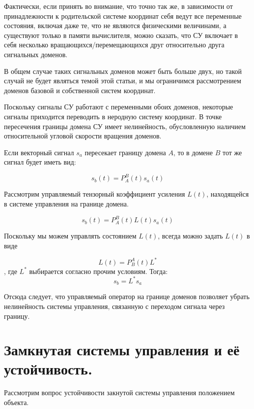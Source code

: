 \documentclass[a4paper]{article}
\begin{document}
Фактически, если принять во внимание, что точно так же, в зависимости от принадлежности к родительской системе координат себя ведут все переменные состояния, включая даже те, что не являются физическими величинами, а существуют только в памяти вычислителя, можно сказать, что СУ включает в себя несколько вращающихся/перемещающихся друг относительно друга сигнальных доменов.

В общем случае таких сигнальных доменов может быть больше двух, но такой случай не будет являться темой этой статьи, и мы ограничимся рассмотрением доменов базовой и собственной систем координат. 

Поскольку сигналы СУ работают с переменными обоих доменов, некоторые сигналы приходится переводить в неродную систему координат. В точке пересечения границы домена СУ имеет нелинейность, обусловленную наличием относительной угловой скорости вращения доменов.

Если векторный сигнал $s_a$ пересекает границу домена $A$, то в домене $B$ тот же сигнал будет иметь вид:

\begin{equation} s_b(t) = P_A^B(t) s_a(t) \end{equation}

Рассмотрим управляемый тензорный коэффициент усиления $L(t)$, находящейся в системе управления на границе домена.

\begin{equation} s_b(t) = P_A^B(t) L(t) s_a(t) \end{equation}

Поскольку мы можем управлять состоянием $L(t)$, всегда можно задать $L(t)$ в виде

\begin{equation} L(t) = P_B^A(t) L^* \end{equation}
, где $L^*$ выбирается согласно прочим условиям. Тогда:
\begin{equation} s_b = L^* s_a \end{equation}

Отсюда следует, что управляемый оператор на границе доменов позволяет убрать нелинейность системы управления, связанную с переходом сигнала через границу.

\section{Замкнутая системы управления и её устойчивость.}
Рассмотрим вопрос устойчивости закнутой системы управления положением объекта.
\end{document}
